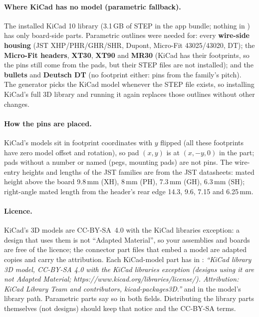 \paragraph{Where KiCad has no model (parametric fallback).} The installed KiCad 10 library (3.1\,GB of STEP in the
app bundle; nothing in ) has only board-side parts. Parametric outlines were
needed for: every \textbf{wire-side housing} (JST XHP/PHR/GHR/SHR, Dupont, Micro-Fit 43025/43020, DT); the
\textbf{Micro-Fit headers}, \textbf{XT30}, \textbf{XT90} and \textbf{MR30} (KiCad has their footprints, so the pins
still come from the pads, but their STEP files are not installed); and the \textbf{bullets} and \textbf{Deutsch DT}
(no footprint either: pins from the family's pitch). The generator picks the KiCad model whenever the STEP file
exists, so installing KiCad's full 3D library and running it again replaces those outlines without other changes.

\paragraph{How the pins are placed.} KiCad's models sit in footprint coordinates with $y$ flipped (all these footprints
have zero model offset and rotation), so pad $(x, y)$ is at $(x, -y, 0)$ in the part; pads without a number or named
 (pegs, mounting pads) are not pins. The wire-entry heights and lengths of the JST families are from the JST
datasheets: mated height above the board 9.8\,mm (XH), 8\,mm (PH), 7.3\,mm (GH), 6.3\,mm (SH); right-angle mated
length from the header's rear edge 14.3, 9.6, 7.15 and 6.25\,mm.

\paragraph{Licence.} KiCad's 3D models are CC-BY-SA~4.0 with the KiCad libraries exception: a design that uses them
is not ``Adapted Material'', so your assemblies and boards are free of the licence; the connector part files that
embed a model are adapted copies and carry the attribution. Each KiCad-model part has in :
\emph{``KiCad library 3D model, CC-BY-SA 4.0 with the KiCad libraries exception (designs using it are not Adapted
Material; https://www.kicad.org/libraries/license/). Attribution: KiCad Library Team and contributors,
kicad-packages3D.''} and in  the model's library path. Parametric parts say so in both fields.
Distributing the library parts themselves (not designs) should keep that notice and the CC-BY-SA terms.

